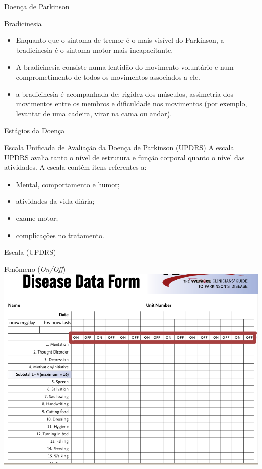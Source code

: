 \documentclass{beamer}
\begin{document}
\begin{frame}{Doença de Parkinson}
  \begin{block}{Bradicinesia}
      \begin{itemize}[<+->]
	\item Enquanto que o sintoma de tremor é o mais visível do Parkinson, a bradicinesia é o sintoma motor mais incapacitante. 
	\item A bradicinesia consiste numa lentidão do movimento voluntário e num comprometimento de todos os movimentos associados a ele.
	\item a bradicinesia é acompanhada de: rigidez dos músculos, assimetria dos movimentos entre os membros e dificuldade nos movimentos (por exemplo, levantar de uma cadeira, virar na cama ou andar).
      \end{itemize}
  \end{block}
\end{frame}
  

\begin{frame}{Estágios da Doença}
  \begin{block}{Escala Unificada de Avaliação da Doença de Parkinson (UPDRS)}
    A escala UPDRS avalia tanto o nível de estrutura e função corporal quanto o nível das atividades.
      A escala contém itens referentes a:
	\begin{itemize}[<+->]
	 \item Mental, comportamento e humor;
	 \item atividades da vida diária;
	 \item exame motor;
	 \item complicações no tratamento.
	\end{itemize}
 \end{block}
\end{frame}

\begin{frame}{Escala (UPDRS)} 
    \begin{block}{Fenômeno (\textit{On/Off})}
      \center \includegraphics[height=2.4 in]{img/updr1-sel.png}
    \end{block}		
\end{frame}
\end{document}
